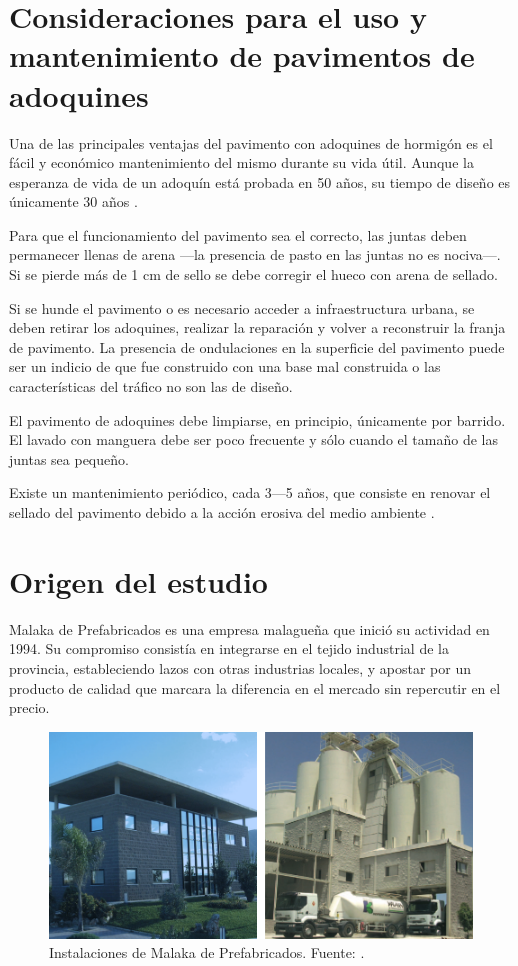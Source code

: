 \section{Consideraciones para el uso y mantenimiento de pavimentos de adoquines}

Una de las principales ventajas del pavimento con adoquines de hormigón es el fácil y económico mantenimiento del mismo durante su vida útil. Aunque la esperanza de vida de un adoquín está probada en 50 años, su tiempo de diseño es únicamente 30 años \cite{euroadoquin}.

Para que el funcionamiento del pavimento sea el correcto, las juntas deben permanecer llenas de arena —la presencia de pasto en las juntas no es nociva—. Si se pierde más de 1 \si{cm} de sello se debe corregir el hueco con arena de sellado.

Si se hunde el pavimento o es necesario acceder a infraestructura urbana, se deben retirar los adoquines, realizar la reparación y volver a reconstruir la franja de pavimento. La presencia de ondulaciones en la superficie del pavimento puede ser un indicio de que fue construido con una base mal construida o las características del tráfico no son las de diseño.

El pavimento de adoquines debe limpiarse, en principio, únicamente por barrido. El lavado con manguera debe ser poco frecuente y sólo cuando el tamaño de las juntas sea pequeño.

Existe un mantenimiento periódico, cada 3—5 años, que consiste en renovar el sellado del pavimento debido a la acción erosiva del medio ambiente \cite{malaka}.

\section{Origen del estudio}
Malaka de Prefabricados es una empresa malagueña que inició su actividad en 1994. Su compromiso consistía en integrarse en el tejido industrial de la provincia, estableciendo lazos con otras industrias locales, y apostar por un producto de calidad que marcara la diferencia en el mercado sin repercutir en el precio.

\begin{figure}[!htb]
\centering
\includegraphics[width=15cm]{malaka1.png}
\caption[Instalaciones de Malaka de Prefabricados.]{Instalaciones de Malaka de Prefabricados. Fuente: \protect\cite{malakacatalogo}.}
\label{fig:malakainstalaciones1}
\end{figure}

